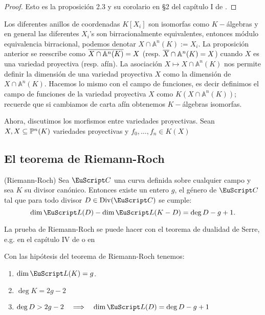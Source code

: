 \documentclass[../../tesis_maestria]{subfiles}
\begin{document}
\begin{proof}
	Esto es la proposición 2.3 y su corolario en \S2 del capítulo I de \cite{HartshorneAG}.
\end{proof}

\begin{nota}
	Los diferentes anillos de coordenadas $K[X_i]$ son isomorfas como $K-$álgebras y en general las diferentes $X_i$'s son birracionalmente equivalentes, entonces módulo equivalencia birracional, podemos denotar $X\cap\mathbb{A}^n(K):= X_i$. La proposición anterior se reescribe como $\overline{X\cap\mathbb{A}^n(K)}=X$ (resp. $\overline{X}\cap\mathbb{A}^n(K)=X$) cuando $X$ es una variedad proyectiva (resp. afín). La asociación $X\mapsto X\cap\mathbb{A}^n(K)$ nos permite definir la dimensión de una variedad proyectiva $X$ como la dimensión de $X\cap\mathbb{A}^n(K)$. Hacemos lo mismo con el campo de funciones, es decir definimos el campo de funciones de la variedad proyectiva $X$ como $K(X\cap\mathbb{A}^n(K))$; recuerde que si cambiamos de carta afín obtenemos $K-$álgebras isomorfas.
\end{nota}

Ahora, discutimos los morfismos entre variedades proyectivas. Sean $X,X\subseteq\mathbb{P}^n(K)$ variedades proyectivas y $f_0,\ldots,f_n\in K(X)$







\subsection{El teorema de Riemann-Roch}

\begin{thm}\label{thm:riemann-roch}(Riemann-Roch)
	Sea $\Cc$ una curva definida sobre cualquier campo y sea $K$ su divisor canónico. Entonces existe un entero $g$, el género de $\Cc$ tal que para todo divisor $D\in\mathrm{Div}(\Cc)$ se cumple:
	\[
		\dim\Ll(D)-\dim\Ll(K-D)=\deg D-g+1.
	\]
\end{thm}

La prueba de Riemann-Roch se puede hacer con el teorema de dualidad de Serre, e.g. en el capítulo IV de \cite{HartshorneAG} o en \cite{SerreGAECDC}


\begin{cor} Con las hipótesis del teorema de Riemann-Roch tenemos:
\begin{enumerate}[label=(\roman*)]
\item $\dim\Ll(K)=g$.
\item $\deg K=2g-2$
\item $\deg D>2g-2\quad\then\quad \dim\Ll(D)=\deg D-g+1$
\end{enumerate}
\end{cor}
\end{document}
